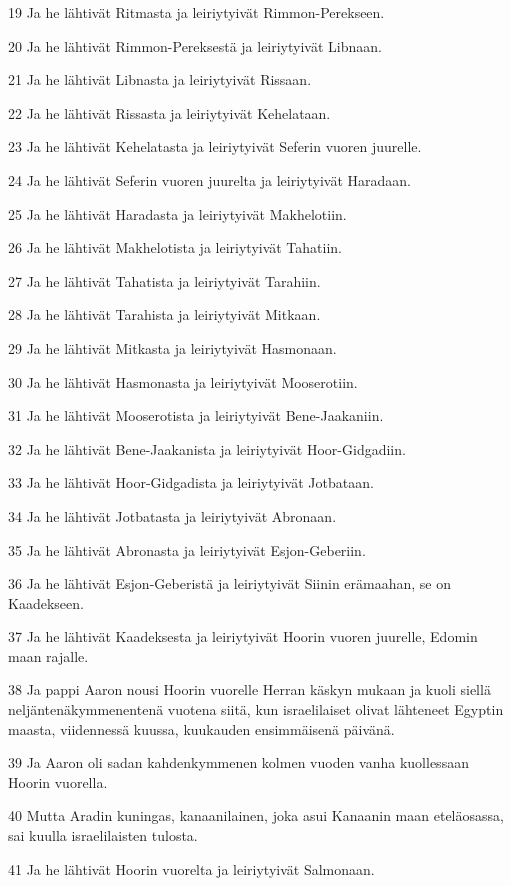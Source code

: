 \par 19 Ja he lähtivät Ritmasta ja leiriytyivät Rimmon-Perekseen.
\par 20 Ja he lähtivät Rimmon-Pereksestä ja leiriytyivät Libnaan.
\par 21 Ja he lähtivät Libnasta ja leiriytyivät Rissaan.
\par 22 Ja he lähtivät Rissasta ja leiriytyivät Kehelataan.
\par 23 Ja he lähtivät Kehelatasta ja leiriytyivät Seferin vuoren juurelle.
\par 24 Ja he lähtivät Seferin vuoren juurelta ja leiriytyivät Haradaan.
\par 25 Ja he lähtivät Haradasta ja leiriytyivät Makhelotiin.
\par 26 Ja he lähtivät Makhelotista ja leiriytyivät Tahatiin.
\par 27 Ja he lähtivät Tahatista ja leiriytyivät Tarahiin.
\par 28 Ja he lähtivät Tarahista ja leiriytyivät Mitkaan.
\par 29 Ja he lähtivät Mitkasta ja leiriytyivät Hasmonaan.
\par 30 Ja he lähtivät Hasmonasta ja leiriytyivät Mooserotiin.
\par 31 Ja he lähtivät Mooserotista ja leiriytyivät Bene-Jaakaniin.
\par 32 Ja he lähtivät Bene-Jaakanista ja leiriytyivät Hoor-Gidgadiin.
\par 33 Ja he lähtivät Hoor-Gidgadista ja leiriytyivät Jotbataan.
\par 34 Ja he lähtivät Jotbatasta ja leiriytyivät Abronaan.
\par 35 Ja he lähtivät Abronasta ja leiriytyivät Esjon-Geberiin.
\par 36 Ja he lähtivät Esjon-Geberistä ja leiriytyivät Siinin erämaahan, se on Kaadekseen.
\par 37 Ja he lähtivät Kaadeksesta ja leiriytyivät Hoorin vuoren juurelle, Edomin maan rajalle.
\par 38 Ja pappi Aaron nousi Hoorin vuorelle Herran käskyn mukaan ja kuoli siellä neljäntenäkymmenentenä vuotena siitä, kun israelilaiset olivat lähteneet Egyptin maasta, viidennessä kuussa, kuukauden ensimmäisenä päivänä.
\par 39 Ja Aaron oli sadan kahdenkymmenen kolmen vuoden vanha kuollessaan Hoorin vuorella.
\par 40 Mutta Aradin kuningas, kanaanilainen, joka asui Kanaanin maan eteläosassa, sai kuulla israelilaisten tulosta.
\par 41 Ja he lähtivät Hoorin vuorelta ja leiriytyivät Salmonaan.
